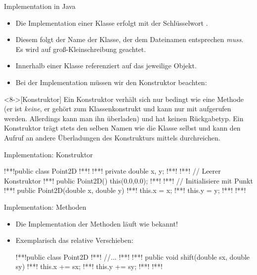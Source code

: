 \begin{frame}{Implementation in Java}
    \begin{itemize}[<+(1)->]
        \item Die Implementation einer Klasse erfolgt mit der Schlüsselwort .
        \item Diesem folgt der Name der Klasse,\pause{} der dem Dateinamen entsprechen \emph{muss}.\pause{} Es wird auf groß-Kleinschreibung geachtet.
        \item Innerhalb einer Klasse referenziert  auf das jeweilige Objekt.
        \item Bei der Implementation müssen wir den Konstruktor beachten:
    \end{itemize}
    \begin{definition}<8->[Konstruktor]
        \pause{}Ein Konstruktor verhält sich nur bedingt wie eine Methode\pause{} (er ist \emph{keine},\pause{} er gehört zum Klassenkonstrukt und kann nur mit  aufgerufen werden.\pause{} Allerdings kann man ihn überladen) und hat keinen Rückgabetyp.\medskip\newline
        Ein Konstruktor trägt stets den selben Namen wie die Klasse selbst und kann den Aufruf an andere Überladungen des Konstrukturs mittels  durchreichen.
    \end{definition}
\end{frame}


\begin{frame}[fragile]{Implementation: Konstruktor}
\begin{plainjava}
!**!public class Point2D {
!**!
!**!    private double x, y;
!**!
!**!    // Leerer Konstruktor
!**!    public Point2D() { this(0.0,0.0); }
!**!
!**!    // Initialisiere mit Punkt
!**!    public Point2D(double x, double y) {
!**!        this.x = x;
!**!        this.y = y;
!**!    }
!**!}
\end{plainjava}
\end{frame}

\begin{frame}[fragile]{Implementation: Methoden}
\begin{itemize}[<+(1)->]
    \item Die Implementation der Methoden läuft wie bekannt!
    \item Exemplarisch das relative Verschieben:\pause{}
\begin{plainjava}
!**!public class Point2D {
!**!    //...
!**!
!**!    public void shift(double sx, double sy) {
!**!        this.x += sx;
!**!        this.y += sy;
!**!    }
!**!}
\end{plainjava}
\end{itemize}
\end{frame}

